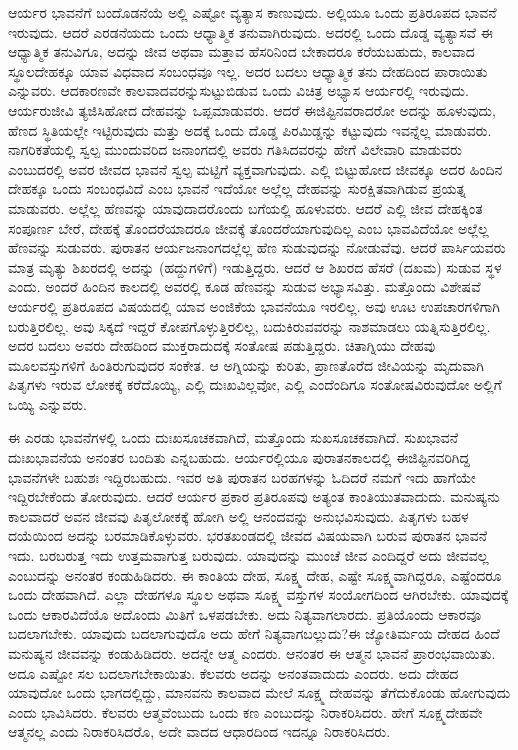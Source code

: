 ಆರ್ಯರ ಭಾವನೆಗೆ ಬಂದೊಡನೆಯೆ ಅಲ್ಲಿ ಎಷ್ಟೋ ವ್ಯತ್ಯಾಸ ಕಾಣುವುದು. ಅಲ್ಲಿಯೂ ಒಂದು ಪ್ರತಿರೂಪದ ಭಾವನೆ ಇರುವುದು. ಆದರೆ ಎರಡನೆಯದು ಒಂದು ಆಧ್ಯಾತ್ಮಿಕ ತನುವಾಗಿರುವುದು. ಅದರಲ್ಲಿ ಒಂದು ದೊಡ್ಡ ವ್ಯತ್ಯಾಸವೆ ಈ ಆಧ್ಯಾತ್ಮಿಕ ತನುವಿಗೂ, ಅದನ್ನು ಜೀವ ಅಥವಾ ಮತ್ತಾವ ಹೆಸರಿನಿಂದ ಬೇಕಾದರೂ ಕರೆಯಬಹುದು, ಕಾಲವಾದ ಸ್ಥೂಲದೇಹಕ್ಕೂ ಯಾವ ವಿಧವಾದ ಸಂಬಂಧವೂ ಇಲ್ಲ. ಅದರ ಬದಲು ಆಧ್ಯಾತ್ಮಿಕ ತನು ದೇಹದಿಂದ ಪಾರಾಯಿತು ಎನ್ನುವರು. ಆದಕಾರಣವೇ ಕಾಲವಾದವರನ್ನು\break ಸುಟ್ಟುಬಿಡುವ ಒಂದು ವಿಚಿತ್ರ ಅಭ್ಯಾಸ ಆರ್ಯರಲ್ಲಿ ಇರುವುದು. ಆರ್ಯರು\break ಜೀವಿ ತ್ಯಜಿಸಿಹೋದ ದೇಹವನ್ನು ಒಪ್ಪಮಾಡುವರು. ಆದರೆ ಈಜಿಪ್ಟಿನವರಾದರೋ ಅದನ್ನು ಹೂಳುವುದು, ಹೆಣದ ಸ್ಥಿತಿಯಲ್ಲೇ ಇಟ್ಟಿರುವುದು ಮತ್ತು ಅದಕ್ಕೆ ಒಂದು ದೊಡ್ಡ ಪಿರಮಿಡ್ಡನ್ನು ಕಟ್ಟುವುದು ಇವನ್ನೆಲ್ಲ ಮಾಡುವರು. ನಾಗರಿಕತೆಯಲ್ಲಿ ಸ್ವಲ್ಪ ಮುಂದುವರಿದ ಜನಾಂಗದಲ್ಲಿ ಅವರು ಗತಿಸಿದವರನ್ನು ಹೇಗೆ ವಿಲೇವಾರಿ ಮಾಡುವರು ಎಂಬುದರಲ್ಲಿ ಅವರ ಜೀವದ ಭಾವನೆ ಸ್ವಲ್ಪ ಮಟ್ಟಿಗೆ ವ್ಯಕ್ತವಾಗುವುದು. ಎಲ್ಲಿ ಬಿಟ್ಟುಹೋದ ಜೀವಕ್ಕೂ ಅದರ ಹಿಂದಿನ ದೇಹಕ್ಕೂ ಒಂದು ಸಂಬಂಧವಿದೆ ಎಂಬ ಭಾವನೆ ಇದೆಯೋ ಅಲ್ಲೆಲ್ಲ ದೇಹವನ್ನು ಸುರಕ್ಷಿತವಾಗಿಡುವ ಪ್ರಯತ್ನ ಮಾಡುವರು. ಅಲ್ಲೆಲ್ಲ ಹೆಣವನ್ನು ಯಾವುದಾದರೊಂದು ಬಗೆಯಲ್ಲಿ ಹೂಳುವರು. ಆದರೆ ಎಲ್ಲಿ ಜೀವ ದೇಹಕ್ಕಿಂತ ಸಂಪೂರ್ಣ ಬೇರೆ, ದೇಹಕ್ಕೆ ತೊಂದರೆಯಾದರೂ ಜೀವಕ್ಕೆ ತೊಂದರೆಯಾಗುವುದಿಲ್ಲ ಎಂಬ ಭಾವವಿದೆಯೋ ಅಲ್ಲೆಲ್ಲ ಹೆಣವನ್ನು ಸುಡುವರು. ಪುರಾತನ ಆರ್ಯಜನಾಂಗದಲ್ಲೆಲ್ಲ ಹೆಣ ಸುಡುವುದನ್ನು ನೋಡುವೆವು. ಆದರೆ ಪಾರ್ಸಿಯವರು ಮಾತ್ರ ಮೃತ್ಯು ಶಿಖರದಲ್ಲಿ ಅದನ್ನು (ಹದ್ದುಗಳಿಗೆ) ಇಡುತ್ತಿದ್ದರು. ಆದರೆ ಆ ಶಿಖರದ ಹೆಸರೆ (ದಖಮ) ಸುಡುವ ಸ್ಥಳ ಎಂದು. ಅಂದರೆ ಹಿಂದಿನ ಕಾಲದಲ್ಲಿ ಅವರಲ್ಲಿ ಕೂಡ ಹೆಣವನ್ನು ಸುಡುವ ಅಭ್ಯಾಸವಿತ್ತು. ಮತ್ತೊಂದು ವಿಶೇಷವೆ ಆರ್ಯರಲ್ಲಿ ಪ್ರತಿರೂಪದ ವಿಷಯದಲ್ಲಿ ಯಾವ ಅಂಜಿಕೆಯ ಭಾವನೆಯೂ ಇರಲಿಲ್ಲ. ಅವು ಊಟ ಉಪಚಾರಗಳಿಗಾಗಿ ಬರುತ್ತಿರಲಿಲ್ಲ. ಅವು ಸಿಕ್ಕದೆ ಇದ್ದರೆ ಕೋಪಗೊಳ್ಳುತ್ತಿರಲಿಲ್ಲ, ಬದುಕಿರುವವರನ್ನು ನಾಶಮಾಡಲು ಯತ್ನಿಸುತ್ತಿರಲಿಲ್ಲ. ಅದರ ಬದಲು ಅವರು ದೇಹದಿಂದ ಮುಕ್ತರಾದುದಕ್ಕೆ ಸಂತೋಷ ಪಡುತ್ತಿದ್ದರು. ಚಿತಾಗ್ನಿಯು ದೇಹವು ಮೂಲವಸ್ತುಗಳಿಗೆ ಹಿಂತಿರುಗುವುದರ ಸಂಕೇತ. ಆ ಅಗ್ನಿಯನ್ನು ಕುರಿತು, ಪ್ರಾಣತೊರೆದ ಜೀವಿಯನ್ನು ಮೃದುವಾಗಿ ಪಿತೃಗಳು ಇರುವ ಲೋಕಕ್ಕೆ ಕರೆದೊಯ್ಯಿ, ಎಲ್ಲಿ ದುಃಖವಿಲ್ಲವೋ, ಎಲ್ಲಿ ಎಂದೆಂದಿಗೂ ಸಂತೋಷವಿರುವುದೋ ಅಲ್ಲಿಗೆ ಒಯ್ಯಿ ಎನ್ನುವರು.

\vskip 2pt

ಈ ಎರಡು ಭಾವನೆಗಳಲ್ಲಿ ಒಂದು ದುಃಖಸೂಚಕವಾಗಿದೆ, ಮತ್ತೊಂದು ಸುಖಸೂಚಕವಾಗಿದೆ. ಸುಖಭಾವನೆ ದುಃಖಭಾವನೆಯ ಅನಂತರ ಬಂದಿತು ಎನ್ನಬಹುದು. ಆರ್ಯರಲ್ಲಿಯೂ ಪುರಾತನಕಾಲದಲ್ಲಿ ಈಜಿಪ್ಟಿನವರಿಗಿದ್ದ ಭಾವನೆಗಳೇ ಬಹುಶಃ ಇದ್ದಿರಬಹುದು. ಇವರ ಅತಿ ಪುರಾತನ ಬರಹಗಳನ್ನು ಓದಿದರೆ ನಮಗೆ ಇದು ಹಾಗೆಯೇ ಇದ್ದಿರಬೇಕೆಂದು ತೋರುವುದು. ಆದರೆ ಆರ್ಯರ ಪ್ರಕಾರ ಪ್ರತಿರೂಪವು ಅತ್ಯಂತ ಕಾಂತಿಯುತವಾದುದು. ಮನುಷ್ಯನು ಕಾಲವಾದರೆ ಅವನ ಜೀವವು ಪಿತೃಲೋಕಕ್ಕೆ ಹೋಗಿ ಅಲ್ಲಿ ಆನಂದವನ್ನು ಅನುಭವಿಸುವುದು. ಪಿತೃಗಳು ಬಹಳ ದಯೆಯಿಂದ ಅದನ್ನು ಬರಮಾಡಿಕೊಳ್ಳುವರು. ಭರತಖಂಡದಲ್ಲಿ ಜೀವದ ವಿಷಯವಾಗಿ ಬರುವ ಪುರಾತನ ಭಾವನೆ ಇದು. ಬರಬರುತ್ತ ಇದು ಉತ್ತಮವಾಗುತ್ತ ಬರುವುದು. ಯಾವುದನ್ನು ಮುಂಚೆ ಜೀವ ಎಂದಿದ್ದರೆ ಅದು ಜೀವವಲ್ಲ ಎಂಬುದನ್ನು ಅನಂತರ ಕಂಡುಹಿಡಿದರು. ಈ ಕಾಂತಿಯ ದೇಹ, ಸೂಕ್ಷ್ಮ ದೇಹ, ಎಷ್ಟೇ ಸೂಕ್ಷ್ಮವಾಗಿದ್ದರೂ, ಎಷ್ಟೆಂದರೂ ಒಂದು ದೇಹವಾಗಿದೆ. ಎಲ್ಲಾ ದೇಹಗಳೂ ಸ್ಥೂಲ ಅಥವಾ ಸೂಕ್ಷ್ಮ ವಸ್ತುಗಳ ಸಂಯೋಗದಿಂದ ಆಗಿರಬೇಕು. ಯಾವುದಕ್ಕೆ ಒಂದು ಆಕಾರವಿದೆಯೊ ಅದೊಂದು ಮಿತಿಗೆ ಒಳಪಡಬೇಕು. ಅದು ನಿತ್ಯವಾಗಲಾರದು. ಪ್ರತಿಯೊಂದು ಆಕಾರವೂ ಬದಲಾಗಬೇಕು. ಯಾವುದು ಬದಲಾಗುವುದೊ ಅದು ಹೇಗೆ ನಿತ್ಯವಾಗಬಲ್ಲುದು?\break ಈ ಜ್ಯೋತಿರ್ಮಯ ದೇಹದ ಹಿಂದೆ ಮನುಷ್ಯನ ಜೀವವನ್ನು ಕಂಡುಹಿಡಿದರು. ಅದನ್ನೇ ಆತ್ಮ ಎಂದರು. ಆನಂತರ ಈ ಆತ್ಮನ ಭಾವನೆ ಪ್ರಾರಂಭವಾಯಿತು. ಅದೂ ಎಷ್ಟೋ ಸಲ ಬದಲಾಗಬೇಕಾಯಿತು. ಕೆಲವರು ಅದನ್ನು ಅನಂತವಾದುದು ಎಂದರು. ಅದು ದೇಹದ ಯಾವುದೋ ಒಂದು ಭಾಗದಲ್ಲಿದ್ದು, ಮಾನವನು ಕಾಲವಾದ ಮೇಲೆ ಸೂಕ್ಷ್ಮ ದೇಹವನ್ನು ತೆಗೆದುಕೊಂಡು ಹೋಗುವುದು ಎಂದು ಭಾವಿಸಿದರು. ಕೆಲವರು ಆತ್ಮವೆಂಬುದು ಒಂದು ಕಣ ಎಂಬುದನ್ನು ನಿರಾಕರಿಸಿದರು. ಹೇಗೆ ಸೂಕ್ಷ್ಮದೇಹವೇ ಆತ್ಮನಲ್ಲ ಎಂದು ನಿರಾಕರಿಸಿದರೊ, ಅದೇ ವಾದದ ಆಧಾರದಿಂದ ಇದನ್ನೂ ನಿರಾಕರಿಸಿದರು.

